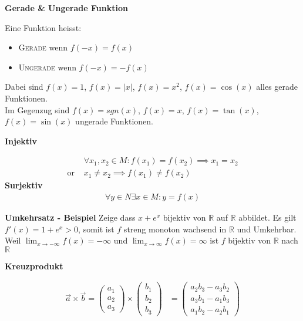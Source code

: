 \documentclass[25pt]{sciposter}
\newcommand{\R}{\mathbb{R}}
\newenvironment{method}[1]{\begin{mdframed}[backgroundcolor=blue!10,innertopmargin=15pt, innerbottommargin=15pt,nobreak=true]
		\textbf{#1 }
	}
	{ 
	\end{mdframed}
}
\begin{document}
\begin{multicols}{3}
\begin{method}{Gerade \& Ungerade Funktion}
	Eine Funktion heisst:
	\begin{itemize}
		\item \textsc{Gerade} wenn $f(-x) = f(x)$
		\item \textsc{Ungerade} wenn $f(-x) = - f(x)$
	\end{itemize}
	Dabei sind $f(x) = 1$, $f(x) = |x|$, $f(x)=x^2$, $f(x) = \cos(x)$ alles gerade Funktionen.\\
	Im Gegenzug sind $f(x) = sgn(x)$, $f(x) = x$, $f(x) = \tan(x)$, $f(x) = \sin(x)$ ungerade Funktionen.
\end{method}


\begin{method}{Injektiv}
	\begin{align*}
	&\forall x_1,x_2 \in M : f(x_1) = f(x_2) \implies x_1 = x_2\\
	\text{or }  &x_1 \not = x_2 \implies f(x_1) \not = f(x_2)
	\end{align*}
	\textbf{Surjektiv}
	\begin{align*}
	\forall y \in N \exists x \in M : y = f(x)
	\end{align*}
\end{method}

\textbf{Umkehrsatz - Beispiel} Zeige dass $x + e^x$ bijektiv von $\R$ auf $\R$ abbildet. Es gilt $f'(x) = 1 + e^x > 0$, somit ist $f$ streng monoton wachsend in $\R$ und Umkehrbar. Weil $\lim_{x \to -\infty} f(x) = - \infty$ und $\lim_{x \to \infty} f(x) = \infty$ ist $f$ bijektiv von $\R$ nach $\R$



\begin{method}{Kreuzprodukt}
	\begin{align*}
	\vec{a}\times\vec{b}=	\begin{pmatrix}a_1 \\ a_2 \\ a_3\end{pmatrix}
	\times
	\begin{pmatrix}b_1 \\ b_2 \\ b_3 \end{pmatrix} &=	\begin{pmatrix}
	a_2b_3 - a_3b_2 \\
	a_3b_1 - a_1b_3 \\
	a_1b_2 - a_2b_1
	\end{pmatrix}
	\end{align*}
\end{method}




\end{multicols}
\end{document}

